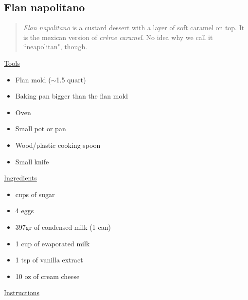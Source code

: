 \subsection{Flan napolitano}

\begin{quote}
\textit{Flan napolitano} is a custard dessert with a layer of soft caramel on top. It is the mexican version of \textit{cr\`eme caramel}. No idea why we call it ``neapolitan", though.
\end{quote}

\underline{Tools}

\begin{itemize}
\item Flan mold ($\sim$1.5 quart)
\item Baking pan bigger than the flan mold
\item Oven
\item Small pot or pan
\item Wood/plastic cooking spoon
\item Small knife
\end{itemize}

\underline{Ingredients}

\begin{itemize}
\item {} cups of sugar
\item 4 eggs
\item 397gr of condensed milk (1 can)
\item 1 cup of evaporated milk
\item 1 tsp of vanilla extract
\item 10 oz of cream cheese
\end{itemize}

\newpage
\underline{Instructions}

